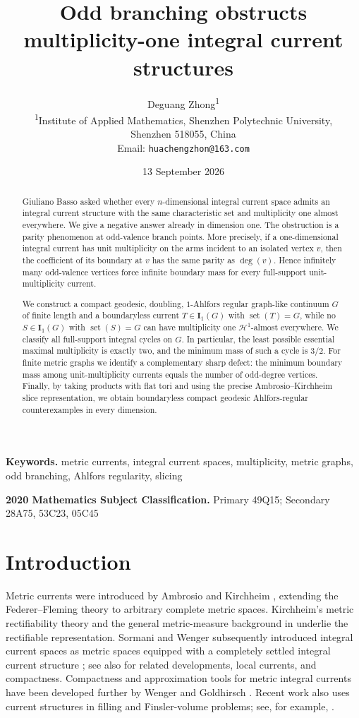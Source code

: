 \documentclass[11pt]{article}
\title{\bf Odd branching obstructs multiplicity-one integral current structures}
\author{%
Deguang Zhong\textsuperscript{1}\\
\small\textsuperscript{1}Institute of Applied Mathematics, Shenzhen Polytechnic University,\\[-0.15em]
Shenzhen 518055, China\\
Email: \texttt{huachengzhon@163.com}
}
\date{13 September 2026}
\theoremstyle{remark}
\newcommand{\I}{\mathbf I}
\newcommand{\Hh}{\mathcal H}
\newcommand{\set}{\operatorname{set}}
\begin{document}
\maketitle

\begin{abstract}
Giuliano Basso asked whether every $n$-dimensional integral current space admits an integral current structure with the same characteristic set and multiplicity one almost everywhere. We give a negative answer already in dimension one. The obstruction is a parity phenomenon at odd-valence branch points. More precisely, if a one-dimensional integral current has unit multiplicity on the arms incident to an isolated vertex $v$, then the coefficient of its boundary at $v$ has the same parity as $\deg(v)$. Hence infinitely many odd-valence vertices force infinite boundary mass for every full-support unit-multiplicity current.

We construct a compact geodesic, doubling, $1$-Ahlfors regular graph-like continuum $G$ of finite length and a boundaryless current $T\in\I_1(G)$ with $\set(T)=G$, while no $S\in\I_1(G)$ with $\set(S)=G$ can have multiplicity one $\Hh^1$-almost everywhere. We classify all full-support integral cycles on $G$. In particular, the least possible essential maximal multiplicity is exactly two, and the minimum mass of such a cycle is $3/2$. For finite metric graphs we identify a complementary sharp defect: the minimum boundary mass among unit-multiplicity currents equals the number of odd-degree vertices. Finally, by taking products with flat tori and using the precise Ambrosio--Kirchheim slice representation, we obtain boundaryless compact geodesic Ahlfors-regular counterexamples in every dimension.
\end{abstract}

\medskip
\noindent
\textbf{Keywords.}
metric currents, integral current spaces, multiplicity, metric graphs, odd branching, Ahlfors regularity, slicing

\medskip
\noindent
\textbf{2020 Mathematics Subject Classification.}
Primary 49Q15; Secondary 28A75, 53C23, 05C45

\section{Introduction}

Metric currents were introduced by Ambrosio and Kirchheim \cite{AK00}, extending the Federer--Fleming theory \cite{FedererFleming60,Federer69,Whitney57} to arbitrary complete metric spaces. Kirchheim's metric rectifiability theory \cite{Kirchheim94} and the general metric-measure background in \cite{AmbrosioTilli04} underlie the rectifiable representation. Sormani and Wenger subsequently introduced integral current spaces as metric spaces equipped with a completely settled integral current structure \cite{SW11}; see also \cite{PortegiesSormani18,Lang11,LangWenger11} for related developments, local currents, and compactness. Compactness and approximation tools for metric integral currents have been developed further by Wenger \cite{Wenger11} and Goldhirsch \cite{Goldhirsch22}. Recent work also uses current structures in filling and Finsler-volume problems; see, for example, \cite{BassoFinsler25, BassoCreutzSoultanis23}.
\end{document}
